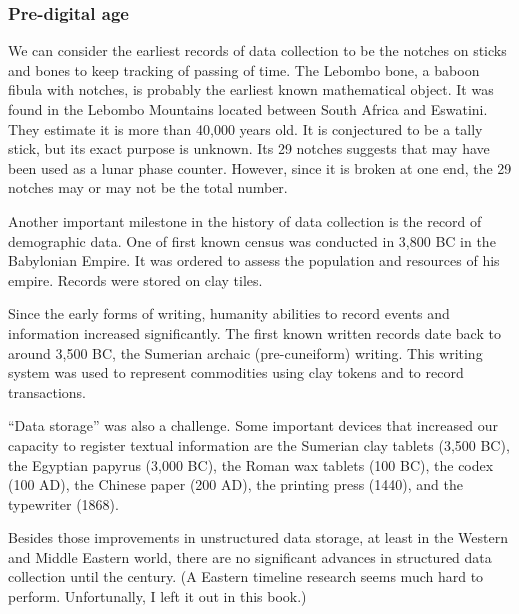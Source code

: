 \subsubsection{Pre-digital age}

We can consider the earliest records of data collection to be the notches on sticks and
bones to keep tracking of passing of time.  The Lebombo bone, a baboon fibula with
notches, is probably the earliest known mathematical object.  It was found in the Lebombo
Mountains located between South Africa and Eswatini.
They estimate it is more
than 40,000 years old. It is conjectured to be a tally stick, but its exact purpose is
unknown. Its 29 notches suggests that may have been used as a lunar phase counter.
However, since it is broken at one end, the 29 notches may or may not be the total
number.

Another important milestone in the history of data collection is the record of
demographic data.  One of first known census was conducted in 3,800 BC in the Babylonian
Empire.  It was ordered to assess the population and resources of
his empire.  Records were stored on  clay  tiles.

Since the early forms of writing, humanity abilities to record events and information
increased significantly.  The first known written records date back to around 3,500 BC, the
Sumerian archaic (pre-cuneiform) writing.  This writing system was used to represent
commodities using clay tokens and to record transactions.

``Data storage'' was also a challenge.  Some important devices that increased our capacity
to register textual information are the Sumerian clay tablets (3,500 BC), the Egyptian
papyrus (3,000 BC), the Roman wax tablets (100 BC), the codex
(100 AD), the Chinese paper (200 AD), the printing press (1440), and the typewriter (1868).


Besides those improvements in unstructured data storage, at least in the Western and
Middle Eastern world, there are no significant advances in structured data collection
until the  century.  (A Eastern timeline research seems much hard to perform.
Unfortunally, I left it out in this book.)

